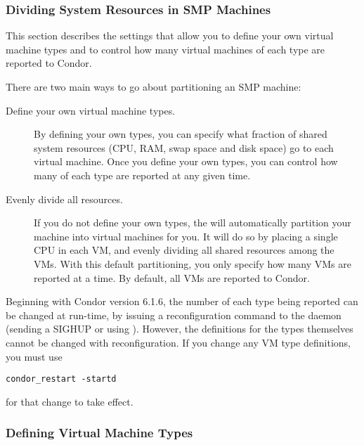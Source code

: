 \subsubsection{\label{sec:SMP-Divide}
Dividing System Resources in SMP Machines}

This section describes the settings that allow you to define your own
virtual machine types and to control how many virtual machines of each
type are reported to Condor.

There are two main ways to go about partitioning an SMP machine:

\begin{description}

\item[Define your own virtual machine types.]
  By defining your own types, you can specify what fraction of shared
  system resources (CPU, RAM, swap space and disk space) go to each
  virtual machine.
  Once you define your own types, you can control how many of each
  type are reported at any given time.

\item[Evenly divide all resources.]  
  If you do not define your own types, the  will
  automatically	partition your machine into virtual machines for you.
  It will do so by placing a single CPU in each VM, and evenly dividing
  all shared resources among the VMs.
  With this default partitioning, you only specify how many
  VMs are reported at a time.
  By default, all VMs are reported to Condor.

\end{description}

Beginning with Condor version 6.1.6, the number of each type being
reported can be changed at run-time, by issuing a reconfiguration
command to
the  daemon (sending a SIGHUP or using ).
However, the definitions for the types themselves cannot be changed
with reconfiguration.
If you change any VM type definitions, you must use 
\begin{verbatim}
condor_restart -startd
\end{verbatim}
for that change to take effect.

\subsubsection{\label{sec:VM-Type-Define}
Defining Virtual Machine Types}

